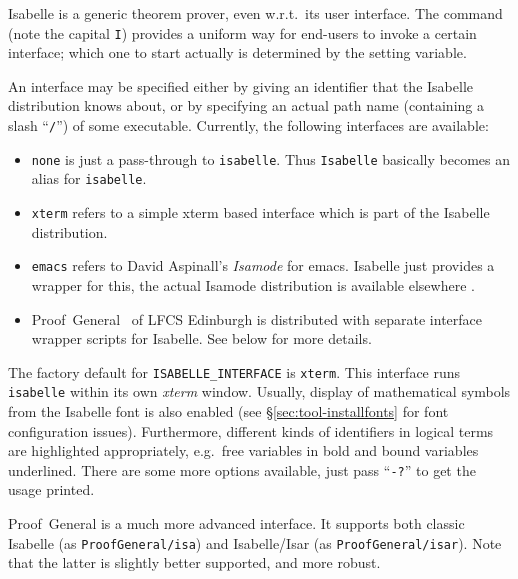 Isabelle is a generic theorem prover, even w.r.t.\ its user interface.  The
 command (note the capital \texttt{I}) provides a uniform
way for end-users to invoke a certain interface; which one to start actually
is determined by the  setting variable.

An interface may be specified either by giving an identifier that the Isabelle
distribution knows about, or by specifying an actual path name (containing a
slash ``\texttt{/}'') of some executable.  Currently, the following interfaces
are available:

\begin{itemize}
\item \texttt{none} is just a pass-through to \texttt{isabelle}. Thus
  \texttt{Isabelle} basically becomes an alias for \texttt{isabelle}.
  
\item \texttt{xterm} refers to a simple xterm based interface which is part of
  the Isabelle distribution.
  
\item \texttt{emacs} refers to David Aspinall's \emph{Isamode} for emacs.  Isabelle just provides a wrapper for this,
  the actual Isamode distribution is available elsewhere \cite{isamode}.
  
\item Proof~General~\cite{proofgeneral} of
  LFCS Edinburgh is distributed with separate interface wrapper scripts for
  Isabelle.  See below for more details.
\end{itemize}

The factory default for \texttt{ISABELLE_INTERFACE} is \texttt{xterm}.  This
interface runs \texttt{isabelle} within its own \textsl{xterm} window.
Usually, display of mathematical symbols from the Isabelle font is also
enabled (see \S\ref{sec:tool-installfonts} for font configuration issues).
Furthermore, different kinds of identifiers in logical terms are highlighted
appropriately, e.g.\ free variables in bold and bound variables underlined.
There are some more options available, just pass ``\texttt{-?}'' to get the
usage printed.

\medskip Proof~General is a much more
advanced interface.  It supports both classic Isabelle (as
\texttt{ProofGeneral/isa}) and Isabelle/Isar (as \texttt{ProofGeneral/isar}).
Note that the latter is slightly better supported, and more robust.


